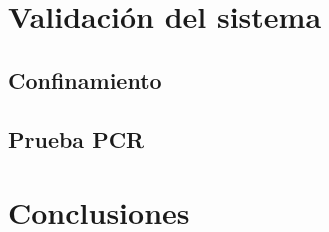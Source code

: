 \documentclass[12pt,a4paper, xcolor=table]{article}
\begin{document}
\section{Validación del sistema}

  \subsection{Confinamiento}

  \subsection{Prueba PCR}



\section{Conclusiones}

\clearpage




\end{document}
